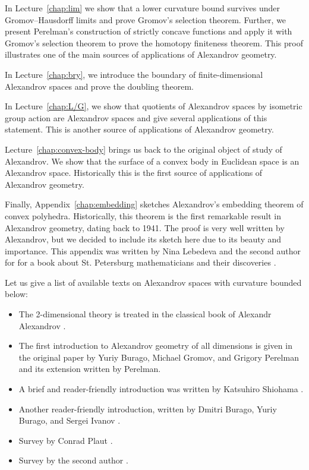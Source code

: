 In Lecture~\ref{chap:lim} we show that a lower curvature bound survives under Gromov--Hausdorff limits and prove Gromov's selection theorem.
Further, we present Perelman's construction of strictly concave functions and apply it with Gromov's selection theorem to prove the homotopy finiteness theorem.
This proof illustrates one of the main sources of applications of Alexandrov geometry.

In Lecture~\ref{chap:bry}, we introduce the boundary of finite-dimensional Alexandrov spaces and prove the doubling theorem.

In Lecture~\ref{chap:L/G}, we show that quotients of Alexandrov spaces by isometric group action are Alexandrov spaces and give several applications of this statement.
This is another source of applications of Alexandrov geometry.

Lecture~\ref{chap:convex-body} brings us back to the original object of study of Alexandrov.
We show that the surface of a convex body in Euclidean space is an Alexandrov space.
Historically this is the first source of applications of Alexandrov geometry.

Finally, Appendix~\ref{chap:embedding} sketches Alexandrov's embedding theorem of convex polyhedra.
Historically, this theorem is the first remarkable result in Alexandrov geometry, dating back to 1941.
The proof is very well written by Alexandrov, but we decided to include its sketch here due to its beauty and importance.
This appendix was written by Nina Lebedeva and the second author for  for a book about St. Petersburg mathematicians and their discoveries \cite{lebedeva-petrunin}.

Let us give a list of available texts on Alexandrov spaces with curvature bounded below: 
\begin{itemize}
\item The 2-dimensional theory is treated in the classical book of Alexandr Alexandrov \cite{alexandrov-1948}.
\item The first introduction to Alexandrov geometry of all dimensions is given in the original paper by Yuriy Burago, Michael Gromov, and Grigory Perelman \cite{burago-gromov-perelman} 
and its extension \cite{perelman1991} written by Perelman.
\item A brief and reader-friendly introduction was written by Katsuhiro Shiohama \cite[Sections 1--8]{shiohama}.
\item Another reader-friendly introduction, written by Dmitri Burago, Yuriy
Burago, and Sergei Ivanov \cite[Chapter 10]{burago-burago-ivanov}.
\item Survey by Conrad Plaut \cite{plaut:survey}.
\item Survey by the second author \cite{petrunin:survey}.
\end{itemize}

